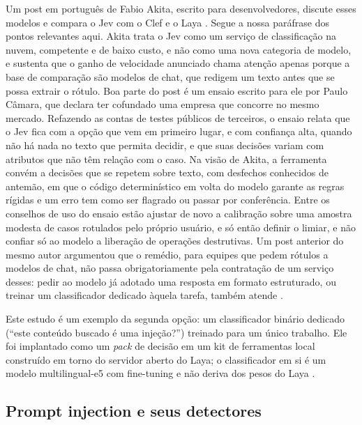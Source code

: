 \documentclass[11pt]{article}
\begin{document}
Um post em português de Fabio Akita, escrito para desenvolvedores, discute esses modelos e compara o Jev com o Clef e o Laya \citep{akita2026jev}. Segue a nossa paráfrase dos pontos relevantes aqui. Akita trata o Jev como um serviço de classificação na nuvem, competente e de baixo custo, e não como uma nova categoria de modelo, e sustenta que o ganho de velocidade anunciado chama atenção apenas porque a base de comparação são modelos de chat, que redigem um texto antes que se possa extrair o rótulo. Boa parte do post é um ensaio escrito para ele por Paulo Câmara, que declara ter cofundado uma empresa que concorre no mesmo mercado. Refazendo as contas de testes públicos de terceiros, o ensaio relata que o Jev fica com a opção que vem em primeiro lugar, e com confiança alta, quando não há nada no texto que permita decidir, e que suas decisões variam com atributos que não têm relação com o caso. Na visão de Akita, a ferramenta convém a decisões que se repetem sobre texto, com desfechos conhecidos de antemão, em que o código determinístico em volta do modelo garante as regras rígidas e um erro tem como ser flagrado ou passar por conferência. Entre os conselhos de uso do ensaio estão ajustar de novo a calibração sobre uma amostra modesta de casos rotulados pelo próprio usuário, e só então definir o limiar, e não confiar só ao modelo a liberação de operações destrutivas. %
Um post anterior do mesmo autor argumentou que o remédio, para equipes que pedem rótulos a modelos de chat, não passa obrigatoriamente pela contratação de um serviço desses: pedir ao modelo já adotado uma resposta em formato estruturado, ou treinar um classificador dedicado àquela tarefa, também atende \citep{akita2026typesafe}. %

Este estudo é um exemplo da segunda opção: um classificador binário dedicado (``este conteúdo buscado é uma injeção?'') treinado para um único trabalho. Ele foi implantado como um \emph{pack} de decisão em um kit de ferramentas local construído em torno do servidor aberto do Laya; o classificador em si é um modelo multilingual-e5 com fine-tuning e não deriva dos pesos do Laya%
.

\subsection{Prompt injection e seus detectores}\label{sec:2.2}
\end{document}
